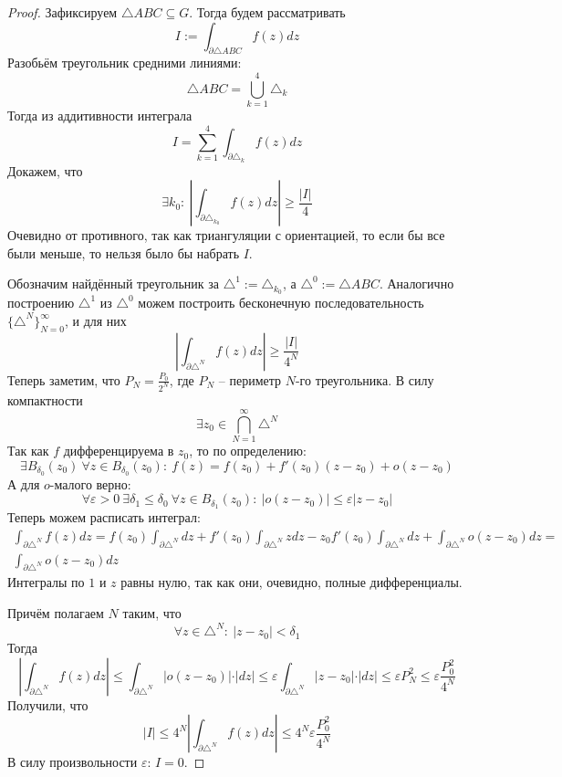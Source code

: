 \documentclass[a4paper,12pt]{article}
\renewcommand{\leq}{\ensuremath{\leqslant}}
\renewcommand{\geq}{\ensuremath{\geqslant}}
\theoremstyle{plain}
\theoremstyle{definition}
\theoremstyle{remark}
\begin{document}
\begin{proof}
	Зафиксируем $\triangle ABC \subseteq G$. Тогда будем рассматривать
	\[
		I := \int_{\partial\triangle ABC}f(z)dz
	\]
	Разобьём треугольник средними линиями:
	\[
		\triangle ABC = \bigcup_{k = 1}^4 \triangle_k
	\]
	Тогда из аддитивности интеграла
	\[
		I = \sum_{k = 1}^4 \int_{\partial \triangle_k}f(z)dz
	\]
	Докажем, что
	\[
		\exists k_0 :\: \left\vert \int_{\partial \triangle_{k_0}}f(z)dz\right\vert \geq \frac{\vert I\vert}{4}
	\]
	Очевидно от противного, так как триангуляции с ориентацией, то если бы все были меньше, то нельзя было бы набрать $I$.

	Обозначим найдённый треугольник за $\triangle^1 := \triangle_{k_0}$, а $\triangle^0 := \triangle ABC$. Аналогично построению $\triangle^1$ из $\triangle^0$ можем построить бесконечную последовательность $\{\triangle^N\}_{N = 0}^\infty$, и для них
	\[
		\left\vert \int_{\partial \triangle^N}f(z)dz\right\vert \geq \frac{\vert I\vert}{4^N}
	\]
	Теперь заметим, что $P_N = \frac{P_0}{2^N}$, где $P_N$ -- периметр $N$-го треугольника. В силу компактности
	\[
		\exists z_0 \in \bigcap_{N = 1}^\infty \triangle^N
	\]
	Так как $f$ дифференцируема в $z_0$, то по определению:
	\[
		\exists B_{\delta_0}(z_0) \: \forall z \in B_{\delta_0}(z_0) :\: f(z) = f(z_0) + f'(z_0)(z - z_0) + o(z - z_0)
	\]
	А для $o$-малого верно:
	\[
		\forall \varepsilon > 0 \: \exists \delta_1 \leq \delta_0 \: \forall z \in B_{\delta_1}(z_0) :\: \vert o(z - z_0)\vert \leq \varepsilon\vert z - z_0\vert
	\]
	Теперь можем расписать интеграл:
	\begin{align*}
		\int_{\partial\triangle^N}f(z)dz = f(z_0)\int_{\partial\triangle^N}dz + f'(z_0)\int_{\partial\triangle^N}zdz - z_0f'(z_0)\int_{\partial\triangle^N} dz + \int_{\partial\triangle^N}o(z - z_0)dz = \\
		\int_{\partial\triangle^N}o(z - z_0)dz
	\end{align*}
	Интегралы по $1$ и $z$ равны нулю, так как они, очевидно, полные дифференциалы.

	Причём полагаем $N$ таким, что
	\[
		\forall z \in \triangle^N :\: \vert z - z_0\vert < \delta_1
	\]
	Тогда
	\[
		\left\vert\int_{\partial\triangle^N} f(z)dz\right\vert \leq \int_{\partial\triangle^N} \vert o(z - z_0)\vert\cdot\vert dz\vert \leq \varepsilon\int_{\partial\triangle^N} \vert z - z_0\vert\cdot\vert dz\vert \leq \varepsilon P_N^2 \leq \varepsilon\frac{P_0^2}{4^N}
	\]
	Получили, что
	\[
		\vert I\vert \leq 4^N\left\vert\int_{\partial\triangle^N} f(z)dz\right\vert \leq 4^N\varepsilon\frac{P_0^2}{4^N}
	\]
	В силу произвольности $\varepsilon$: $I = 0$.
\end{proof}
\end{document}

